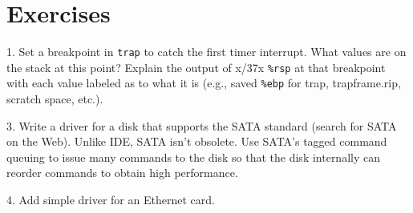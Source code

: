 \section{Exercises}

1. Set a breakpoint in
\lstinline{trap}
to catch the first timer interrupt. What values are on the stack at this
point?  Explain the output of x/37x
\texttt{\%rsp}
at that breakpoint with each value
labeled as to what it is (e.g., saved
\texttt{\%ebp}
for trap, trapframe.rip, scratch space, etc.).

3. Write a driver for a disk that supports the SATA standard (search for SATA on
the Web). Unlike IDE, SATA isn't obsolete.  Use SATA's tagged command queuing to
issue many commands to the disk so that the disk internally can reorder commands
to obtain high performance.

4. Add simple driver for an Ethernet card.
